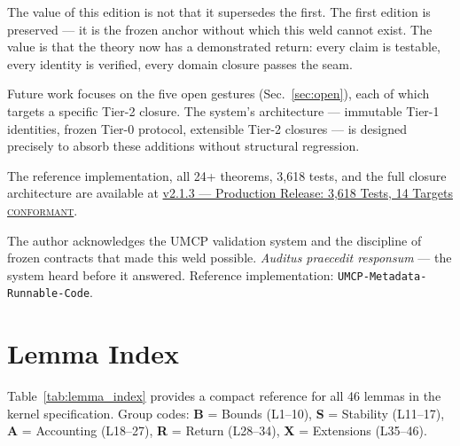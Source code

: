 \documentclass[
  aps,
  prd,
  preprint,
  superscriptaddress,
  nofootinbib,
  floatfix,
  longbibliography
]{revtex4-2}
\newcommand{\regime}[1]{\textnormal{\textsc{#1}}}
\newcommand{\lat}[1]{\textit{#1}}
\begin{document}
The value of this edition is not that it supersedes the first.
The first edition is preserved — it is the frozen anchor
without which this weld cannot exist.
The value is that the theory now has a demonstrated return:
every claim is testable, every identity is verified,
every domain closure passes the seam.

Future work focuses on the five open gestures
(Sec.~\ref{sec:open}), each of which targets a specific
Tier-2 closure. The system's architecture —
immutable Tier-1 identities, frozen Tier-0 protocol,
extensible Tier-2 closures — is designed precisely
to absorb these additions without structural regression.

The reference implementation, all 24+ theorems,
3{,}618 tests, and the full closure architecture are
available at
\href{https://github.com/calebpruett927/GENERATIVE-COLLAPSE-DYNAMICS/releases/tag/v2.1.3}{v2.1.3 --- Production Release: 3{,}618 Tests, 14 Targets \regime{conformant}}.

\begin{acknowledgments}
The author acknowledges the UMCP validation system and the
discipline of frozen contracts that made this weld possible.
\lat{Auditus praecedit responsum} --- the system heard before
it answered. Reference implementation:
\texttt{UMCP-Metadata-Runnable-Code}.
\end{acknowledgments}



\appendix

\section{Lemma Index}\label{app:lemmas}

Table~\ref{tab:lemma_index} provides a compact reference
for all 46 lemmas in the kernel specification.
Group codes: \textbf{B} = Bounds (L1--10),
\textbf{S} = Stability (L11--17),
\textbf{A} = Accounting (L18--27),
\textbf{R} = Return (L28--34),
\textbf{X} = Extensions (L35--46).
\end{document}

